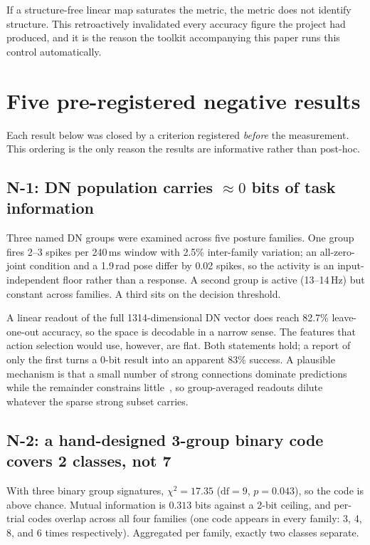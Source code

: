 \documentclass[11pt]{article}
\begin{document}
If a structure-free linear map saturates the metric, the metric does not
identify structure. This retroactively invalidated every accuracy figure the
project had produced, and it is the reason the toolkit accompanying this paper
runs this control automatically.

\section{Five pre-registered negative results}
\label{sec:negative}

Each result below was closed by a criterion registered \emph{before} the
measurement. This ordering is the only reason the results are informative rather
than post-hoc.

\subsection{N-1: DN population carries $\approx 0$ bits of task information}

Three named DN groups were examined across five posture families. One group fires
2--3 spikes per 240\,ms window with 2.5\% inter-family variation; an all-zero-joint
condition and a 1.9\,rad pose differ by 0.02 spikes, so the activity is an
input-independent floor rather than a response. A second group is active
(13--14\,Hz) but constant across families. A third sits on the decision threshold.

A linear readout of the full 1314-dimensional DN vector does reach 82.7\%
leave-one-out accuracy, so the space is decodable in a narrow sense. The features
that action selection would use, however, are flat. Both statements hold; a report
of only the first turns a 0-bit result into an apparent 83\% success.
A plausible mechanism is that a small number of strong connections dominate
predictions while the remainder constrains
little~\cite{strongconn}, so group-averaged readouts dilute whatever the sparse
strong subset carries.

\subsection{N-2: a hand-designed 3-group binary code covers 2 classes, not 7}

With three binary group signatures, $\chi^2 = 17.35$ ($\mathrm{df} = 9$,
$p = 0.043$), so the code is above chance. Mutual information is
$0.313$ bits against a 2-bit ceiling, and per-trial codes overlap across all four
families (one code appears in every family: 3, 4, 8, and 6 times respectively).
Aggregated per family, exactly two classes separate.
\end{document}
